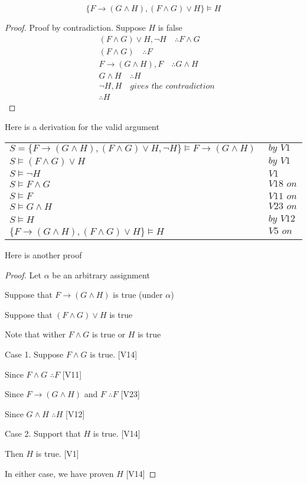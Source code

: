 
\begin{exmp}
$$\{F\to (G\wedge H),(F\wedge G) \vee H\}\vDash H$$
\end{exmp}

\begin{proof}
Proof by contradiction. Suppose $H$ is false
\begin{align*}
   & (F\wedge G)\vee H , \neg H \quad \therefore F\wedge G\\
   & (F\wedge G) \quad \therefore F\\
   & F\to (G\wedge H) , F \quad \therefore G\wedge H\\
   & G\wedge H \quad \therefore H\\
   & \neg H , H \quad \textit{gives the contradiction} \\
   & \therefore H
\end{align*}
\end{proof}

Here is a derivation for the valid argument

\begin{tabular}{ll}
    $S = \{F\to (G\wedge H),(F\wedge G) \vee H, \neg H\} \vDash F\to (G\wedge H)$  & $\textit{ by V1 }$\\
    $S \vDash (F\wedge G) \vee H $ &$ \textit{ by V1 }$ \\
   $ S \vDash \neg H$  & $\textit{ V1 } $\\
    $S \vDash F\wedge G$  & $\textit{ V18 on line 2,3 }$ \\
   $ S \vDash F $ & $\textit{ V11 on line 4 }$ \\
   $ S \vDash G \wedge H $ & $\textit{ V23 on line 1,5 }$ \\
   $ S \vDash H $ & $\textit{ by V12 on 6 }$ \\
  $  \{F\to (G\wedge H),(F\wedge G) \vee H\} \vDash H$  & $\textit{ V5 on line 3,7 }$
\end{tabular}

Here is another proof 

\begin{proof}

Let $\alpha$ be an arbitrary assignment 

Suppose that $F\to (G\wedge H)$ is true (under $\alpha$)

Suppose that $(F\wedge G) \vee H$ is true

Note that wither $F\wedge G$ is true or $H$ is true

Case 1. Suppose $F\wedge G$ is true. [V14]

Since $F\wedge G$ $\therefore F$  [V11]

Since $F\to (G\wedge H)$ and $F$ $\therefore F$  [V23]

Since $G\wedge H$ $\therefore H$ [V12]

Case 2. Support that $H$ is true.  [V14]

Then $H$ is true.  [V1]

In either case, we have proven $H$ [V14]

\end{proof}


